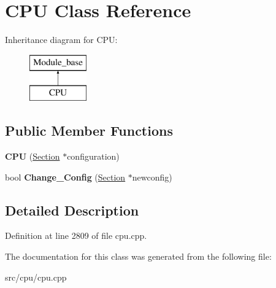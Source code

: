\hypertarget{classCPU}{\section{C\-P\-U Class Reference}
\label{classCPU}
}
Inheritance diagram for C\-P\-U\-:\begin{figure}[H]
\begin{center}
\leavevmode
\includegraphics[height=2.000000cm]{classCPU}
\end{center}
\end{figure}
\subsection*{Public Member Functions}
\begin{DoxyCompactItemize}
\item 
\hypertarget{classCPU_a7ff8bd1e2634ffa09329984eb00fb890}{{\bfseries C\-P\-U} (\hyperlink{classSection}{Section} $\ast$configuration)}\label{classCPU_a7ff8bd1e2634ffa09329984eb00fb890}

\item 
\hypertarget{classCPU_a84dcaf3dac834731a61c49cacc77f910}{bool {\bfseries Change\-\_\-\-Config} (\hyperlink{classSection}{Section} $\ast$newconfig)}\label{classCPU_a84dcaf3dac834731a61c49cacc77f910}

\end{DoxyCompactItemize}


\subsection{Detailed Description}


Definition at line 2809 of file cpu.\-cpp.



The documentation for this class was generated from the following file\-:\begin{DoxyCompactItemize}
\item 
src/cpu/cpu.\-cpp\end{DoxyCompactItemize}
